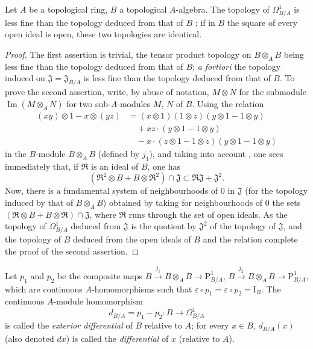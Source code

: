 \begin{proposition}[20.4.5]
\label{0.20.4.5}
Let $A$ be a topological ring, $B$ a topological $A$-algebra.
The topology of $\Omega^1_{B/A}$ is less fine than the topology deduced from that of $B$ ; if in $B$ the square of every open ideal is open, these two topologies are identical.
\end{proposition}

\begin{proof}
The first assertion is trivial, the tensor product topology on $B\otimes_A B$ being less fine than the topology deduced from that of $B$; \emph{a fortiori} the topology induced on $\mathfrak{J}=\mathfrak{J}_{B/A}$ is less fine than the topology deduced from that of $B$.
To prove the second assertion, write, by abuse of notation, $M\otimes N$ for the submodule $\operatorname{Im}(M\otimes_A N)$ for two sub-$A$-modules $M$, $N$ of $B$.
Using the relation
\[
  \begin{aligned}
  (xy)\otimes 1-x\otimes(yz)
  &=(x\otimes 1)(1\otimes z)(y\otimes 1-1\otimes y)\\
  &\quad+xz\cdot(y\otimes 1-1\otimes y)\\
  &\quad-x\cdot(z\otimes 1-1\otimes z)(y\otimes 1-1\otimes y)
  \end{aligned}
\]
in the $B$-module $B\otimes_A B$ (defined by $j_1$), and taking into account , one sees immediately that, if $\mathfrak{R}$ is an ideal of $B$, one has
\begin{equation}
\tag{20.4.5.1}
  \label{0.20.4.5.1}
  (\mathfrak{R}^2\otimes B+B\otimes\mathfrak{R}^2)\cap\mathfrak{J}\subset\mathfrak{R}\mathfrak{J}+\mathfrak{J}^2.
\end{equation}
Now, there is a fundamental system of neighbourhoods of $0$ in $\mathfrak{J}$ (for the topology induced by that of $B\otimes_A B$) obtained by taking for neighbourhoods of $0$ the sets $(\mathfrak{R}\otimes B+B\otimes\mathfrak{R})\cap\mathfrak{J}$, where $\mathfrak{R}$ runs through the set of open ideals.
As the topology of $\Omega^1_{B/A}$ deduced from $\mathfrak{J}$ is the quotient by $\mathfrak{J}^2$ of the topology of $\mathfrak{J}$, and the topology of $B$ deduced from the open ideals of $B$ and the relation  complete the proof of the second assertion.
\end{proof}

\begin{definition}[20.4.6]
\label{0.20.4.6}
Let $p_1$ and $p_2$ be the composite maps $B\xrightarrow{j_1}B\otimes_A B\to\mathrm{P}^1_{B/A}$, $B\xrightarrow{j_2}B\otimes_A B\to\mathrm{P}^1_{B/A}$, which are continuous $A$-homomorphisms such that $\varepsilon\circ p_1=\varepsilon\circ p_2=\mathrm{I}_B$.
The continuous $A$-module homomorphism
\begin{equation}
\tag{20.4.6.1}
  \label{0.20.4.6.1}
  d_{B/A} = p_1-p_2:B\to\Omega^1_{B/A}
\end{equation}
is called the \emph{exterior differential} of $B$ relative to $A$; for every $x\in B$, $d_{B/A}(x)$ (also denoted $dx$) is called the \emph{differential} of $x$ (relative to $A$).
\end{definition}

